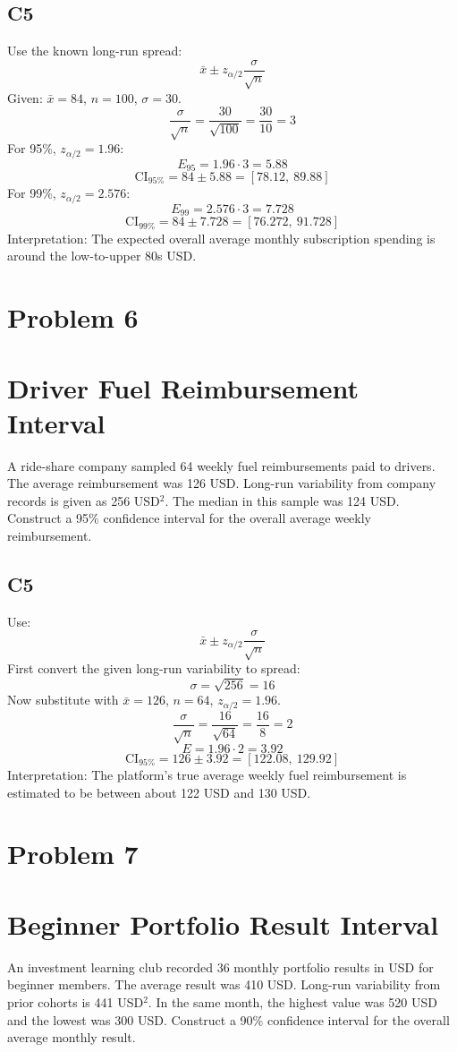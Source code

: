 \begin{ExamProblems}
		\subsection*{C5}
		Use the known long-run spread:
		\[
		\bar{x} \pm z_{\alpha/2}\frac{\sigma}{\sqrt{n}}
		\]
		Given: $\bar{x}=84$, $n=100$, $\sigma=30$.
		\[
		\frac{\sigma}{\sqrt{n}}=\frac{30}{\sqrt{100}}=\frac{30}{10}=3
		\]
		For 95\%, $z_{\alpha/2}=1.96$:
		\[
		E_{95}=1.96\cdot 3=5.88
		\]
		\[
		\text{CI}_{95\%}=84\pm 5.88=[78.12,\ 89.88]
		\]
		For 99\%, $z_{\alpha/2}=2.576$:
		\[
		E_{99}=2.576\cdot 3=7.728
		\]
		\[
		\text{CI}_{99\%}=84\pm 7.728=[76.272,\ 91.728]
		\]
		Interpretation: The expected overall average monthly subscription spending is around the low-to-upper 80s USD.

		\newpage
		\item
		\section{Problem 6}
		\section{Driver Fuel Reimbursement Interval}
		A ride-share company sampled 64 weekly fuel reimbursements paid to drivers.
		The average reimbursement was 126 USD.
		Long-run variability from company records is given as 256 USD$^2$.
		The median in this sample was 124 USD.
		Construct a 95\% confidence interval for the overall average weekly reimbursement.

		\subsection*{C5}
		Use:
		\[
		\bar{x} \pm z_{\alpha/2}\frac{\sigma}{\sqrt{n}}
		\]
		First convert the given long-run variability to spread:
		\[
		\sigma=\sqrt{256}=16
		\]
		Now substitute with $\bar{x}=126$, $n=64$, $z_{\alpha/2}=1.96$.
		\[
		\frac{\sigma}{\sqrt{n}}=\frac{16}{\sqrt{64}}=\frac{16}{8}=2
		\]
		\[
		E=1.96\cdot 2=3.92
		\]
		\[
		\text{CI}_{95\%}=126\pm 3.92=[122.08,\ 129.92]
		\]
		Interpretation: The platform's true average weekly fuel reimbursement is estimated to be between about 122 USD and 130 USD.

		\newpage
		\item
		\section{Problem 7}
		\section{Beginner Portfolio Result Interval}
		An investment learning club recorded 36 monthly portfolio results in USD for beginner members.
		The average result was 410 USD.
		Long-run variability from prior cohorts is 441 USD$^2$.
		In the same month, the highest value was 520 USD and the lowest was 300 USD.
		Construct a 90\% confidence interval for the overall average monthly result.


\end{ExamProblems}
